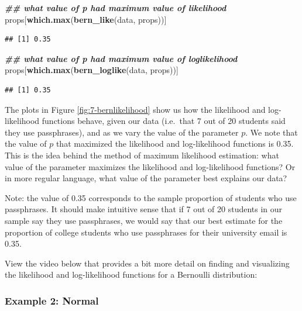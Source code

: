 \documentclass[
]{book}
\newenvironment{Shaded}{\begin{snugshade}}{\end{snugshade}}
\newcommand{\DocumentationTok}[1]{\textcolor[rgb]{0.56,0.35,0.01}{\textbf{\textit{#1}}}}
\newcommand{\FunctionTok}[1]{\textcolor[rgb]{0.13,0.29,0.53}{\textbf{#1}}}
\newcommand{\NormalTok}[1]{#1}
\begin{document}
\begin{Shaded}
\begin{Highlighting}[]
\DocumentationTok{\#\# what value of p had maximum value of likelihood}
\NormalTok{props[}\FunctionTok{which.max}\NormalTok{(}\FunctionTok{bern\_like}\NormalTok{(data, props))]}
\end{Highlighting}
\end{Shaded}

\begin{verbatim}
## [1] 0.35
\end{verbatim}

\begin{Shaded}
\begin{Highlighting}[]
\DocumentationTok{\#\# what value of p had maximum value of loglikelihood}
\NormalTok{props[}\FunctionTok{which.max}\NormalTok{(}\FunctionTok{bern\_loglike}\NormalTok{(data, props))]}
\end{Highlighting}
\end{Shaded}

\begin{verbatim}
## [1] 0.35
\end{verbatim}

The plots in Figure \ref{fig:7-bernlikelihood} show us how the likelihood and log-likelihood functions behave, given our data (i.e.~that 7 out of 20 students said they use passphrases), and as we vary the value of the parameter \(p\). We note that the value of \(p\) that maximized the likelihood and log-likelihood functions is 0.35. This is the idea behind the method of maximum likelihood estimation: what value of the parameter maximizes the likelihood and log-likelihood functions? Or in more regular language, what value of the parameter best explains our data?

Note: the value of 0.35 corresponds to the sample proportion of students who use passphrases. It should make intuitive sense that if 7 out of 20 students in our sample say they use passphrases, we would say that our best estimate for the proportion of college students who use passphrases for their university email is 0.35.

View the video below that provides a bit more detail on finding and visualizing the likelihood and log-likelihood functions for a Bernoulli distribution:

\subsubsection{Example 2: Normal}\label{example-2-normal}
\end{document}
